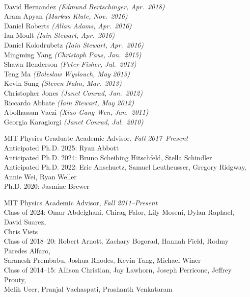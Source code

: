 \documentclass[11pt]{article}
\newcommand{\sh}{\phantom{.....}}
\begin{document}
\\ \sh David Hernandez \textit{(Edmund Bertschinger, Apr.~2018)}
\\ \sh Aram Apyan \textit{(Markus Klute, Nov.~2016)}
\\ \sh Daniel Roberts \textit{(Allan Adams, Apr.~2016)}
\\ \sh Ian Moult \textit{(Iain Stewart, Apr.~2016)}
\\ \sh Daniel Kolodrubetz \textit{(Iain Stewart, Apr.~2016)}
\\ \sh Mingming Yang \textit{(Christoph Paus, Jan.~2015)}
\\ \sh  Shawn Henderson \textit{(Peter Fisher, Jul.~2013)}
\\ \sh  Teng Ma \textit{(Boleslaw Wyslouch, May 2013)}
\\ \sh  Kevin Sung \textit{(Steven Nahn, Mar.~2013)}
\\ \sh  Christopher Jones \textit{(Janet Conrad, Jun.~2012)}
\\ \sh  Riccardo Abbate \textit{(Iain Stewart, May 2012)}
\\ \sh  Abolhassan Vaezi \textit{(Xiao-Gang Wen, Jan.~2011)}
\\ \sh  Georgia Karagiorgi \textit{(Janet Conrad, Jul.~2010)}
\item MIT Physics Graduate Academic Advisor,  \textit{Fall 2017--Present}
\\ \sh Anticipated Ph.D. 2025: Ryan Abbott
\\ \sh Anticipated Ph.D. 2024:  Bruno Scheihing Hitschfeld, Stella Schindler
\\ \sh Anticipated Ph.D. 2022: Eric Anschuetz, Samuel Leutheusser, Gregory Ridgway, 
\\ \sh \sh Annie Wei, Ryan Weller
\\ \sh Ph.D. 2020: Jasmine Brewer
\item MIT Physics Academic Advisor, \textit{Fall 2011--Present}
\\ \sh Class of 2024: Omar Abdelghani, Chirag Falor, Lily Moseni, Dylan Raphael, David Suarez,
\\ \sh \sh Chris Viets
\\ \sh Class of 2018--20: Robert Arnott, Zachary Bogorad, Hannah Field, Rodmy Paredes Alfaro, 
\\ \sh \sh Saranesh Prembabu, Joshua Rhodes,  Kevin Tang, Michael Winer
\\ \sh Class of 2014--15:  Allison Christian, Jay Lawhorn, Joseph Perricone, Jeffrey Prouty,
\\ \sh \sh Melih Ucer, Pranjal Vachaspati, Prashanth Venkataram
\end{document}
